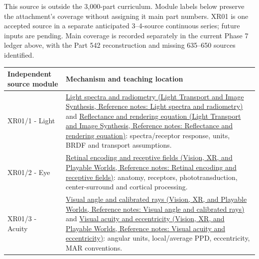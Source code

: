 \hypertarget{appendix-fd090d982a15-xr01---independent-seeing-and-representation-source}{}

This source is outside the 3,000-part curriculum. Module labels below preserve the attachment's coverage without assigning it main part numbers. XR01 is one accepted source in a separate anticipated 3--4-source continuous series; future inputs are pending. Main coverage is recorded separately in the current Phase 7 ledger above, with the Part 542 reconstruction and missing 635--650 sources identified.

{\def\LTcaptype{none} %
\begin{longtable}[]{@{}
  >{\raggedright\arraybackslash}p{}
  >{\raggedright\arraybackslash}p{}@{}}
\toprule\noalign{}
\begin{minipage}[b]{\linewidth}\raggedright
Independent source module
\end{minipage} & \begin{minipage}[b]{\linewidth}\raggedright
Mechanism and teaching location
\end{minipage} \\
\midrule\noalign{}
\endhead
\bottomrule\noalign{}
\endlastfoot
XR01/1 - Light & \href{../04-Light-Transport-and-Image-Synthesis/main.pdf\#nameddest=appendix-215c2570199b}{Light spectra and radiometry (Light Transport and Image Synthesis, Reference notes: Light spectra and radiometry)} and \href{../04-Light-Transport-and-Image-Synthesis/main.pdf\#nameddest=appendix-96da0b153b77}{Reflectance and rendering equation (Light Transport and Image Synthesis, Reference notes: Reflectance and rendering equation)}: spectra/receptor response, units, BRDF and transport assumptions. \\
XR01/2 - Eye & \href{../07-Vision-XR-and-Playable-Worlds/main.pdf\#nameddest=appendix-7281c15ac44a}{Retinal encoding and receptive fields (Vision, XR, and Playable Worlds, Reference notes: Retinal encoding and receptive fields)}: anatomy, receptors, phototransduction, center-surround and cortical processing. \\
XR01/3 - Acuity & \href{../07-Vision-XR-and-Playable-Worlds/main.pdf\#nameddest=appendix-7d356c396d1a}{Visual angle and calibrated rays (Vision, XR, and Playable Worlds, Reference notes: Visual angle and calibrated rays)} and \href{../07-Vision-XR-and-Playable-Worlds/main.pdf\#nameddest=appendix-b491fc48c54b}{Visual acuity and eccentricity (Vision, XR, and Playable Worlds, Reference notes: Visual acuity and eccentricity)}: angular units, local/average PPD, eccentricity, MAR conventions. \\

\end{longtable}}

